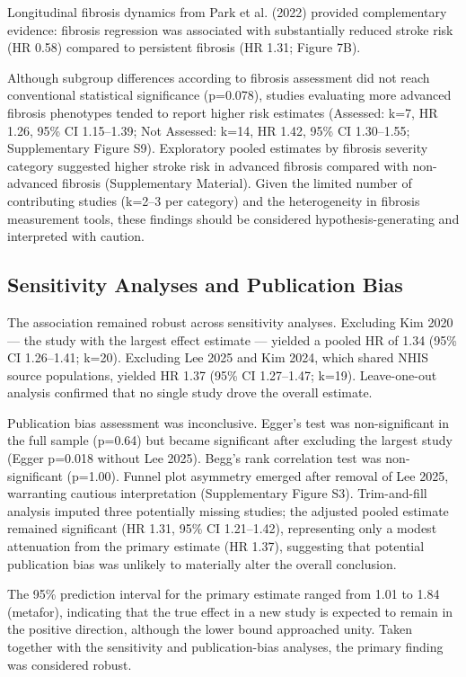 \documentclass[12pt,a4paper]{article}
\begin{document}
Longitudinal fibrosis dynamics from Park et al. (2022) provided complementary evidence: fibrosis regression was associated with substantially reduced stroke risk (HR 0.58) compared to persistent fibrosis (HR 1.31; Figure 7B).

Although subgroup differences according to fibrosis assessment did not reach conventional statistical significance (p=0.078), studies evaluating more advanced fibrosis phenotypes tended to report higher risk estimates (Assessed: k=7, HR 1.26, 95\% CI 1.15--1.39; Not Assessed: k=14, HR 1.42, 95\% CI 1.30--1.55; Supplementary Figure S9). Exploratory pooled estimates by fibrosis severity category suggested higher stroke risk in advanced fibrosis compared with non-advanced fibrosis (Supplementary Material). Given the limited number of contributing studies (k=2--3 per category) and the heterogeneity in fibrosis measurement tools, these findings should be considered hypothesis-generating and interpreted with caution.

\subsection{Sensitivity Analyses and Publication Bias}

The association remained robust across sensitivity analyses. Excluding Kim 2020 — the study with the largest effect estimate — yielded a pooled HR of 1.34 (95\% CI 1.26--1.41; k=20). Excluding Lee 2025 and Kim 2024, which shared NHIS source populations, yielded HR 1.37 (95\% CI 1.27--1.47; k=19). Leave-one-out analysis confirmed that no single study drove the overall estimate.

Publication bias assessment was inconclusive. Egger's test was non-significant in the full sample (p=0.64) but became significant after excluding the largest study (Egger p=0.018 without Lee 2025). Begg's rank correlation test was non-significant (p=1.00). Funnel plot asymmetry emerged after removal of Lee 2025, warranting cautious interpretation (Supplementary Figure S3). Trim-and-fill analysis imputed three potentially missing studies; the adjusted pooled estimate remained significant (HR 1.31, 95\% CI 1.21--1.42), representing only a modest attenuation from the primary estimate (HR 1.37), suggesting that potential publication bias was unlikely to materially alter the overall conclusion.

The 95\% prediction interval for the primary estimate ranged from 1.01 to 1.84 (metafor), indicating that the true effect in a new study is expected to remain in the positive direction, although the lower bound approached unity. Taken together with the sensitivity and publication-bias analyses, the primary finding was considered robust.
\end{document}
